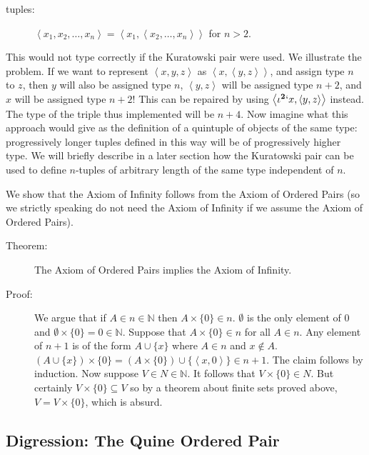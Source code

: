 \documentclass[12pt]{book}
\begin{document}
\begin{description}

\item[tuples:] $\left<x_1,x_2,\ldots,x_n\right> =
\left<x_1,\left<x_2,\ldots,x_n\right>\right>$ for $n>2$.

\end{description}

This would not type correctly if the Kuratowski pair were used.  We illustrate the problem.
If we want to represent $\left<x,y,z\right>$ as $\left<x,\left<y,z\right>\right>$, and assign type $n$ to $z$,
then $y$ will also be assigned type $n$, $\left<y,z\right>$ will be assigned type $n+2$, and $x$ will be assigned type
$n+2$!  This can be repaired by using $\left<\iota^{\bf 2}`x,\left<y,z\right>\right>$ instead.  The type of the triple thus implemented will be $n+4$.  Now imagine what this approach would give as the definition of a quintuple of objects of the same type:  progressively longer tuples defined in this way will be of progressively higher type.  We will briefly describe in a later section how the
Kuratowski pair can be used to define $n$-tuples of arbitrary length of the same type independent of $n$.

We show that the Axiom of Infinity follows from the Axiom of Ordered
Pairs (so we strictly speaking do not need the Axiom of Infinity if we
assume the Axiom of Ordered Pairs).

\begin{description}

\item[Theorem:]  The Axiom of Ordered Pairs implies the Axiom of Infinity.

\item[Proof:] We argue that if $A \in n \in {\mathbb N}$ then
$A\times\{0\} \in n$.  $\emptyset$ is the only element of 0 and
$\emptyset\times \{0\}=0 \in {\mathbb N}$.  Suppose that $A
\times\{0\} \in n$ for all $A \in n$.  Any element of $n+1$ is of the
form $A \cup \{x\}$ where $A \in n$ and $x \not\in A$.  $(A \cup
\{x\}) \times \{0\} = (A \times\{0\}) \cup \{\left<x,0\right>\} \in
n+1$.  The claim follows by induction.  Now suppose $V \in N \in
{\mathbb N}$.  It follows that $V \times \{0\} \in N$.  But certainly
$V \times \{0\} \subseteq V$ so by a theorem about finite sets proved
above, $V = V\times\{0\}$, which is absurd.

\end{description}


\subsection{Digression:  The Quine Ordered Pair}
\end{document}
